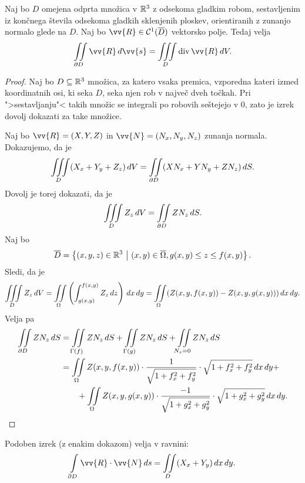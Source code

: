 
\begin{izrek}[Gauss]
Naj bo $D$ omejena odprta množica v $\mathbb{R}^3$ z odsekoma gladkim
robom, sestavljenim iz končnega števila odsekoma gladkih sklenjenih
ploskev, orientiranih z zunanjo normalo glede na $D$. Naj bo
$\vv{R} \in \mathcal{C}^1(\overline{D})$ vektorsko
polje. Tedaj velja
\[
\liint_{\partial D} \vv{R}\,d\vv{s} = \liiint_D \dv\vv{R}\,dV.
\]
\end{izrek}


\begin{proof}
Naj bo $D \subseteq \mathbb{R}^3$ množica, za katero vsaka premica,
vzporedna kateri izmed koordinatnih osi, ki seka $D$, seka njen rob
v največ dveh točkah. Pri ">sestavljanju"< takih množic se
integrali po robovih seštejejo v $0$, zato je izrek dovolj dokazati
za take množice.

Naj bo $\vv{R} = (X, Y, Z)$ in $\vv{N} = (N_x, N_y, N_z)$ zunanja
normala. Dokazujemo, da je
\[
\iiint\limits_D (X_x + Y_y + Z_z)\,dV =
\iint\limits_{\partial D} (X N_x + Y N_y + Z N_z)\,dS.
\]
Dovolj je torej dokazati, da je
\[
\iiint\limits_D Z_z\,dV = \iint\limits_{\partial D} Z N_z\,dS.
\]
Naj bo
\[
\overline{D} =
\left\{(x, y, z) \in \mathbb{R}^3~\middle\vert~(x,y) \in \overline{\Omega}, g(x, y) \leq z \leq f(x,y)\right\}.
\]
Sledi, da je
\[
\iiint\limits_D Z_z\,dV =
\iint\limits_\Omega \left(\int_{g(x,y)}^{f(x,y)} Z_z\,dz\right)\,dx\,dy =
\iint\limits_\Omega(Z(x, y, f(x, y)) - Z(x, y, g(x, y)))\,dx\,dy.
\]
Velja pa
\begin{align*}
\iint\limits_{\partial D} Z N_z\,dS
&=
\iint\limits_{\Gamma(f)} Z N_z\,dS +
\iint\limits_{\Gamma(g)} Z N_z\,dS +
\iint\limits_{N_z = 0} Z N_z\,dS
\\
&=
\iint\limits_\Omega Z(x, y, f(x, y)) \cdot
\frac{1}{\sqrt{1 + f_x^2 + f_y^2}} \cdot
\sqrt{1 + f_x^2 + f_y^2}\,dx\,dy +
\\
&\qquad
+\iint\limits_\Omega Z(x, y, g(x, y)) \cdot
\frac{-1}{\sqrt{1 + g_x^2 + g_y^2}} \cdot
\sqrt{1 + g_x^2 + g_y^2}\,dx\,dy. \qedhere
\end{align*}
\end{proof}

\begin{opomba}
Podoben izrek (z enakim dokazom) velja v ravnini:
\[
\lint_{\partial D} \vv{R} \cdot \vv{N}\,ds =
\liint_D (X_x + Y_y)\,dx\,dy.
\]
\end{opomba}

